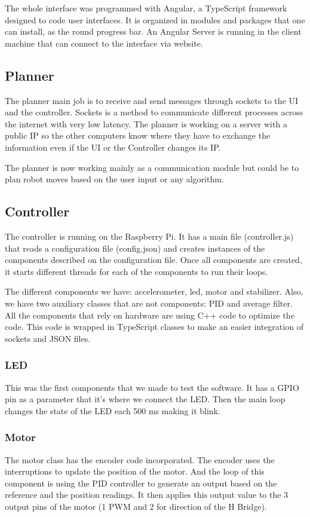 The whole interface was programmed with Angular, a TypeScript framework designed to code user interfaces.
It is organized in modules and packages that one can install, as the round progress bar. An Angular Server is 
running in the client machine that can connect to the interface via website.

\subsection{Planner}
The planner main job is to receive and send messages through sockets to the UI and the controller. Sockets is a method to communicate
different processes across the internet with very low latency. The planner is working on a server with a public IP
so the other computers know where they have to exchange the information even if the UI or the Controller changes its IP.

The planner is now working mainly as a communication module but could be to plan robot moves based on the user input or
any algorithm.

\subsection{Controller}
The controller is running on the Raspberry Pi. It has a main file (controller.js) that reads
a configuration file (config.json) and creates instances of the components described on the configuration file.
Once all components are created, it starts different threads for each of the components to run their loops.

The different components we have: accelerometer, led, motor and stabilizer. Also, we have two auxiliary classes that are
not components: PID and average filter. All the components that rely on hardware are using C++ code to optimize
the code. This code is wrapped in TypeScript classes to make an easier integration of sockets and JSON files.

\subsubsection{LED}
This was the first components that we made to test the software.
It has a GPIO pin as a parameter that it's where we connect the LED.
Then the main loop changes the state of the LED each 500 ms making it blink.
\subsubsection{Motor}
The motor class has the encoder code incorporated. The encoder uses the interruptions to update the position of the motor.
And the loop of this component is using the PID controller to generate an output based on the reference and the position readings.
It then applies this output value to the 3 output pins of the motor (1 PWM and 2 for direction of the H Bridge).
